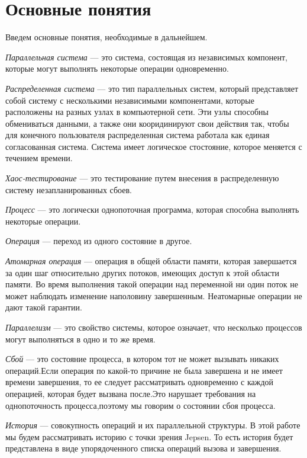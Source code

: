 \documentclass[12pt,  openany]{book}
\begin{document}
\section{Основные понятия}
Введем основные понятия,  необходимые в дальнейшем.

\emph{Параллельная система} ---  это система, состоящая из независимых компонент, которые могут выполнять некоторые операции одновременно.

\emph{Распределенная система} ---  это тип параллельных систем, который представляет собой систему с несколькими независимыми компонентами, которые расположены на разных узлах в компьютерной сети.  Эти узлы способны обмениваться данными, а также они кооридинируют свои действия так, чтобы для конечного пользователя распределенная система работала как единая согласованная система.  Система имеет логическое стостояние, которое меняется с течением времени. 

\emph{Хаос-тестирование \cite{chaosTesting}} ---  это тестирование путем внесения в распределенную систему незапланированных сбоев.

\emph{Процесс} ---  это логически однопоточная программа, которая способна выполнять некоторые операции. 

\emph{Операция} --- переход из одного состояние в другое. 

\emph{Атомарная операция} --- операция в общей области памяти, которая завершается за один шаг относительно других потоков, имеющих доступ к этой области памяти.  Во время выполнения такой операции над переменной ни один поток не может наблюдать изменение наполовину завершенным. Неатомарные операции не дают такой гарантии.  \cite{habrAtomicOperation}

\emph{Параллелизм} ---  это свойство системы, которое означает, что несколько процессов могут выполняться в одно и то же время. 

\emph{Сбой} ---  это состояние процесса, в котором тот не может вызывать никаких операций.Если операция по какой-то причине не была завершена и не имеет времени завершения, то ее следует рассматривать одновременно с каждой операцией, которая будет вызвана после.Это нарушает требования на однопоточность процесса,поэтому мы говорим о состоянии сбоя процесса.

\emph{История} ---  совокупность операций и их параллельной структуры.  В этой работе мы будем рассматривать историю с точки зрения  Jepsen. То есть история будет представлена в виде упорядоченного списка операций вызова и завершения.
\end{document}
